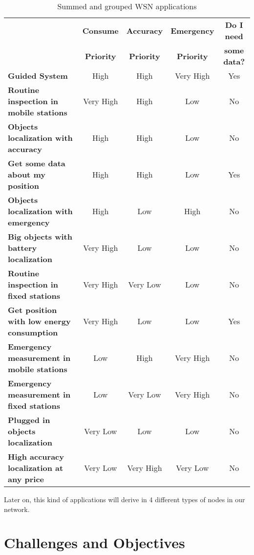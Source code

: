 \begin{table}[ht]\footnotesize
\begin{center}
 \begin{tabular}{l||cccc}
  \noalign{\vspace*{0.5cm}}
  & \textbf{Consume} & \textbf{Accuracy} & \textbf{Emergency} & \textbf{Do I need} \\
  & \textbf{Priority} & \textbf{Priority} & \textbf{Priority} & \textbf{some data?} \\
  \hline\hline
  \textbf{Guided System} & High & High & Very High & Yes \\
  \hline 
  \textbf{Routine inspection in mobile stations} & Very High & High & Low & No \\
  \hline
  \textbf{Objects localization with accuracy} & High & High & Low & No \\
  \hline
  \textbf{Get some data about my position} & High & High & Low & Yes \\
  \hline
  \textbf{Objects localization with emergency} & High & Low & High & No \\
  \hline
  \textbf{Big objects with battery localization} & Very High & Low & Low & No \\
  \hline
  \textbf{Routine inspection in fixed stations} & Very High & Very Low & Low & No \\
  \hline
  \textbf{Get position with low energy consumption} & Very High & Low & Low & Yes \\
  \hline
  \textbf{Emergency measurement in mobile stations} & Low & High & Very High & No \\
  \hline
  \textbf{Emergency measurement in fixed stations} & Low & Very Low & Very High & No \\
  \hline
  \textbf{Plugged in objects localization} & Very Low & Low & Low & No \\
  \hline
  \textbf{High accuracy localization at any price} & Very Low & Very High & Very Low & No \\
  \hline
  \end{tabular}
 \caption{Summed and grouped \ac{WSN} applications}
 \label{tab:wsn_applications}
\end{center}
\end{table}

Later on, this kind of applications will derive in 4 different types of nodes in our network.

\section{Challenges and Objectives}

